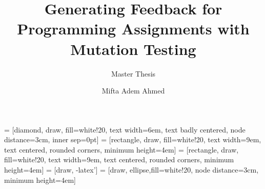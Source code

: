 \documentclass{layout/siccs-thesis}
\begin{document}
 = [diamond, draw, fill=white!20, 
text width=6em, text badly centered, node distance=3cm, inner sep=0pt]
 = [rectangle, draw, fill=white!20, 
text width=9em, text centered, rounded corners, minimum height=4em]
 = [rectangle, draw, fill=white!20, 
text width=9em, text centered, rounded corners, minimum height=4em]
 = [draw, -latex']
 = [draw, ellipse,fill=white!20, node distance=3cm,
minimum height=4em]
\frontmatter

\title{Generating Feedback for Programming Assignments with Mutation Testing}
\subtitle{Master Thesis}
\author{Mifta Adem Ahmed}









\tableofcontents

\listoffigures
 


% 
\mainmatter






%
%






%

%

\setcounter{biburlnumpenalty}{7000}
\setcounter{biburllcpenalty}{7000}
\setcounter{biburlucpenalty}{7000}



\printbibliography[title = {References}]



\appendix


%
\end{document}
